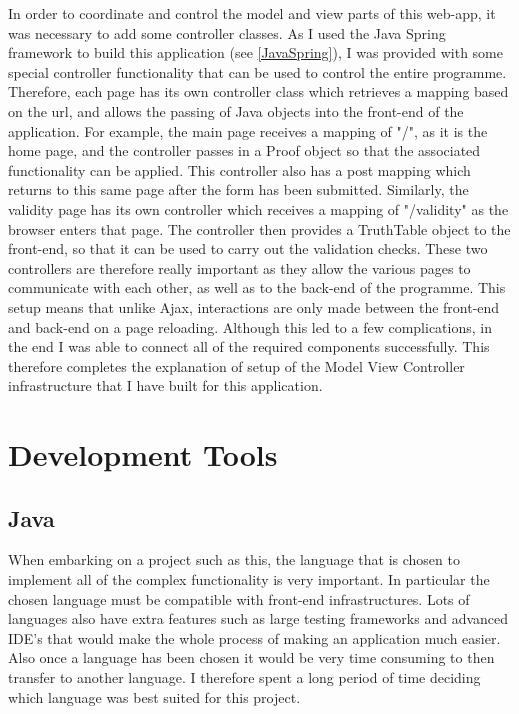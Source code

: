 In order to coordinate and control the model and view parts of this web-app, it was necessary to add some controller classes. As I used the Java Spring framework to build this application (see \ref{JavaSpring}), I was provided with some special controller functionality that can be used to control the entire programme. Therefore, each page has its own controller class which retrieves a mapping based on the url, and allows the passing of Java objects into the front-end of the application. For example, the main page receives a mapping of "/", as it is the home page, and the controller passes in a Proof object so that the associated functionality can be applied. This controller also has a post mapping which returns to this same page after the form has been submitted. Similarly, the validity page has its own controller which receives a mapping of "/validity" as the browser enters that page. The controller then provides a TruthTable object to the front-end, so that it can be used to carry out the validation checks. These two controllers are therefore really important as they allow the various pages to communicate with each other, as well as to the back-end of the programme. This setup means that unlike Ajax, interactions are only made between the front-end and back-end on a page reloading. Although this led to a few complications, in the end I was able to connect all of the required components successfully. This therefore completes the explanation of setup of the Model View Controller infrastructure that I have built for this application.

\pagebreak

\section{Development Tools}

\subsection{Java}

When embarking on a project such as this, the language that is chosen to implement all of the complex functionality is very important. In particular the chosen language must be compatible with front-end infrastructures. Lots of languages also have extra features such as large testing frameworks and advanced IDE's that would make the whole process of making an application much easier. Also once a language has been chosen it would be very time consuming to then transfer to another language. I therefore spent a long period of time deciding which language was best suited for this project.

